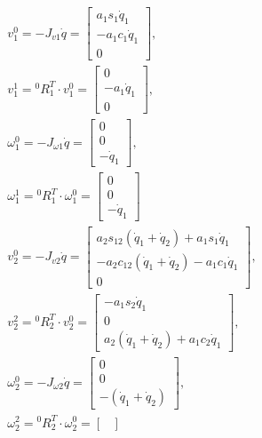 \begin{align}
    & v^0_1 = -J_{v1} \dot{q} =
    \begin{bmatrix}
        a_1 s_1 \dot{q}_1 \\ -a_1 c_1 \dot{q}_1 \\ 0
    \end{bmatrix}\!\!, &
    \\
    & v^1_1 = {}^0R_1^T \!\cdot v^0_1 =
    \begin{bmatrix}
        0 \\ -a_1 \dot{q}_1 \\ 0
    \end{bmatrix}\!\!,
    \\
    &\omega^0_1 = -J_{\omega1} \dot{q} =
    \begin{bmatrix}
        0 \\ 0 \\ -\dot{q}_1
    \end{bmatrix}\!\!,
    \\
    & \omega^1_1 = {}^0R_1^T \!\cdot \omega^0_1 =
    \begin{bmatrix}
        0 \\ 0 \\ -\dot{q}_1
    \end{bmatrix}\!\!
    \\
    & v^0_2 = -J_{v2} \dot{q} =
    \begin{bmatrix}
        a_2 s_{12} (\dot{q}_1 + \dot{q}_2) + a_1 s_1 \dot{q}_1 \\
        -a_2 c_{12} (\dot{q}_1 + \dot{q}_2) - a_1 c_1 \dot{q}_1 \\
        0
    \end{bmatrix}\!\!,
    \\
    & v^2_2 = {}^0R_2^T \!\cdot v^0_2 =
    \begin{bmatrix}
        -a_1 s_2 \dot{q}_1 \\ 0 \\ a_2 (\dot{q}_1 + \dot{q}_2) + a_1 c_2 \dot{q}_1
    \end{bmatrix}\!\!,
    \\
    & \omega^0_2 = -J_{\omega2} \dot{q} =
    \begin{bmatrix}
        0 \\ 0 \\ -(\dot{q}_1 + \dot{q}_2)
    \end{bmatrix}\!\!,
    \\
    & \omega^2_2 = {}^0R_2^T \!\cdot \omega^0_2 =
    \begin{bmatrix}

\end{bmatrix}
\end{align}
